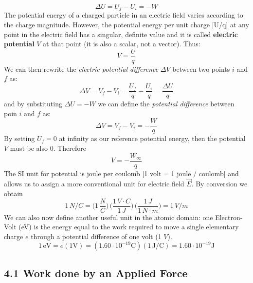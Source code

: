 \documentclass[12pt, a4paper]{article}
\begin{document}
		\begin{equation*}
			\Delta U = U_f - U_i = -W
			\tag{4-1}
		\end{equation*}
		The potential energy of a charged particle in an electric field varies according to the charge magnitude. However, the potential energy per unit charge [U/q] at any point in the electric field has a singular, definite value and it is called \textbf{electric potential} $V$ at that point (it is also a scalar, not a vector). Thus:
		\begin{equation*}
			V = \frac{U}{q}
			\tag{4-2}
		\end{equation*}
		We can then rewrite the \textit{electric potential difference} $\Delta V$ between two points $i$ and $f$ as:
		\begin{equation*}
			\Delta V = V_f - V_i = \frac{U_f}{q} - \frac{U_i}{q} = \frac{\Delta U}{q}
			\tag{4-3}
		\end{equation*}
		and by substituting $\Delta U =  -W$ we can define the \textit{potential difference} between poin $i$ and $f$ as:
		\begin{equation*}
			\Delta V = V_f - V_i = - \frac{W}{q}
			\tag{potential difference, 4-4}
		\end{equation*}
		By setting $U_f = 0$ at infinity as our reference potential energy, then the potential $V$ must be also 0. Therefore
		\begin{equation*}
			V = - \frac{W_{\infty}}{q}
		\end{equation*}
		The SI unit for potential is joule per coulomb [1 volt = 1 joule / coulomb] and allows us to assign a more conventional unit for electric field $\vec{E}$. By conversion we obtain
		\[
			1 \, N/C = \biggl( 1 \, \frac{N}{C} \biggl) \,
					   \biggl( \frac{1 \, V \cdot C}{1 \, J}\biggl) \,
					   \biggl( \frac{1 \, J}{1 \, N \cdot m} \biggl)
					 = 1 \, V / m
			\tag{4-5}
		\]
		We can also now define another useful unit in the atomic domain: one Electron-Volt (eV) is the energy equal to the work required to move a single elementary charge $e$ through a potential difference of one volt (1 $V$).
		\[
			1 \, \text{eV} = e(1 \text{V}) =  ( 1.60 \cdot 10^{-19} \text{C} )
			( 1 \, \text{J} / \text{C} ) = 1.60 \cdot 10^{-19} \text{J}
		\]
		
		
		
		\subsection*{4.1 Work done by an Applied Force}
		
\end{document}
